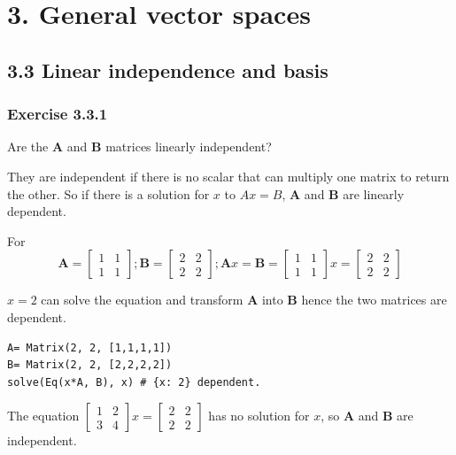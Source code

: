 \section{3. General vector spaces}

\subsection{3.3 Linear independence and basis}

\subsubsection{Exercise 3.3.1}

Are the \textbf{A} and \textbf{B} matrices linearly independent?

They are independent if there is no scalar that can multiply one matrix to return the other. So if there
is a solution for $x$  to $Ax = B$, \textbf{A} and \textbf{B} are linearly dependent.

For
$$
\mathbf{A} = \left[\begin{matrix}1 & 1\\1 & 1\end{matrix}\right];
\mathbf{B} = \left[\begin{matrix}2 & 2\\2 & 2\end{matrix}\right];
\mathbf{A}x = \mathbf{B} = \left[\begin{matrix}1 & 1\\1 & 1\end{matrix}\right]x = \left[\begin{matrix}2 & 2\\2 & 2\end{matrix}\right]
$$

$x= 2$ can solve the equation and transform \textbf{A} into \textbf{B} hence the
two matrices are dependent.

\begin{verbatim}
A= Matrix(2, 2, [1,1,1,1])
B= Matrix(2, 2, [2,2,2,2])
solve(Eq(x*A, B), x) # {x: 2} dependent.
\end{verbatim}

The equation $\left[\begin{matrix}1 & 2 \\3  & 4 \end{matrix}\right]x = \left[\begin{matrix}2 & 2\\2 & 2\end{matrix}\right]$
has no solution for $x$, so \textbf{A} and \textbf{B} are independent.

